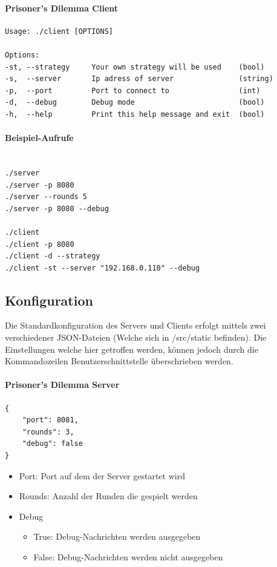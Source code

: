 \documentclass[12pt, letterpaper]{article}
\begin{document}
\paragraph{Prisoner's Dilemma Client}
\begin{Verbatim}
Usage: ./client [OPTIONS]

Options:
-st, --strategy     Your own strategy will be used    (bool)
-s,  --server       Ip adress of server               (string)
-p,  --port         Port to connect to                (int)
-d,  --debug        Debug mode                        (bool)
-h,  --help         Print this help message and exit  (bool)
\end{Verbatim}

\paragraph{Beispiel-Aufrufe}
\begin{Verbatim}

./server
./server -p 8080
./server --rounds 5
./server -p 8080 --debug

./client
./client -p 8080
./client -d --strategy
./client -st --server "192.168.0.110" --debug
\end{Verbatim}

\newpage

\subsection{Konfiguration}
Die Standardkonfiguration des Servers und Clients erfolgt mittels zwei verschiedener JSON-Dateien (Welche sich in /src/static befinden). Die Einstellungen welche hier getroffen werden, können jedoch durch die Kommandozeilen Benutzerschnittstelle überschrieben werden. 

\paragraph{Prisoner's Dilemma Server}

\begin{verbatim}
{
    "port": 8081,
    "rounds": 3,
    "debug": false
}
\end{verbatim}

\begin{itemize}
	\item Port: Port auf dem der Server gestartet wird
	\item Rounds: Anzahl der Runden die gespielt werden
	\item Debug
	\begin{itemize}
		\item True: Debug-Nachrichten werden ausgegeben
		\item False: Debug-Nachrichten werden nicht ausgegeben
	\end{itemize}
\end{itemize}
\end{document}
